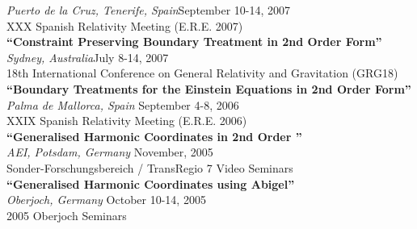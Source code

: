 \documentclass[11pt]{seilercv}
\begin{document}
{{\textit{Puerto de la Cruz, Tenerife, Spain}\hfill September 10-14, 2007 \\ 
XXX Spanish Relativity Meeting (E.R.E. 2007) \\[2ex]
\textbf{``Constraint Preserving Boundary Treatment in 2nd Order Form''}\\
\textit{Sydney, Australia}\hfill July 8-14, 2007 \\
18th International Conference on General Relativity and Gravitation (GRG18) \\[2ex]
\textbf{``Boundary Treatments for the Einstein Equations in 2nd Order Form''}\\
 \textit{Palma de Mallorca, Spain} \hfill September 4-8, 2006 \\ 
XXIX Spanish Relativity Meeting (E.R.E. 2006) \\[2ex]
\textbf{``Generalised Harmonic Coordinates in 2nd Order ''}\\ 
\textit{AEI, Potsdam, Germany} \hfill November, 2005 \\
Sonder-Forschungsbereich / TransRegio 7 Video Seminars\\[2ex]
\textbf{``Generalised Harmonic Coordinates using Abigel''} \\
\textit{Oberjoch, Germany} \hfill October 10-14, 2005 \\
2005 Oberjoch Seminars }}
\pagebreak
\end{document}

